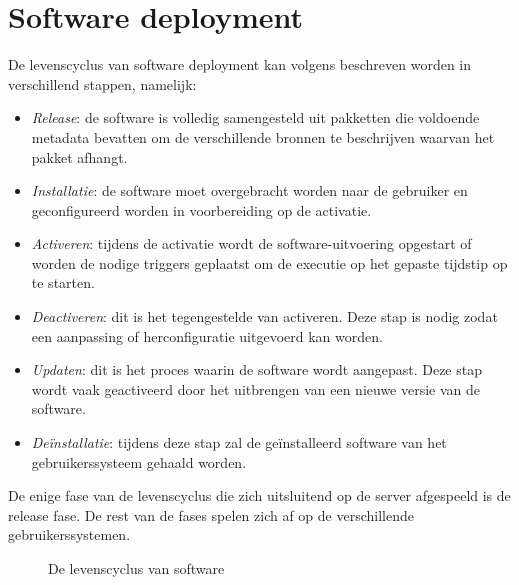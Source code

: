 \section{Software deployment}\label{sec:softwareLevenscyclus}
De levenscyclus van software deployment kan volgens \citet{softwareDeployment,hall1999cooperative} beschreven worden in verschillend stappen, namelijk:
\begin{itemize}
\item \emph{Release}: de software is volledig samengesteld uit pakketten die voldoende metadata bevatten om de verschillende bronnen te beschrijven waarvan het pakket afhangt.
\item \emph{Installatie}: de software moet overgebracht worden naar de gebruiker en geconfigureerd worden in voorbereiding op de activatie.
\item \emph{Activeren}: tijdens de activatie wordt de software-uitvoering opgestart of worden de nodige triggers geplaatst om de executie op het gepaste tijdstip op te starten.
\item \emph{Deactiveren}: dit is het tegengestelde van activeren. Deze stap is nodig zodat een aanpassing of herconfiguratie uitgevoerd kan worden.
\item \emph{Updaten}: dit is het proces waarin de software wordt aangepast. Deze stap wordt vaak geactiveerd door het uitbrengen van een nieuwe versie van de software.
\item \emph{Deïnstallatie}: tijdens deze stap zal de geïnstalleerd software van het gebruikerssysteem gehaald worden.
\end{itemize}
De enige fase van de levenscyclus die zich uitsluitend op de server afgespeeld is de release fase.
De rest van de fases spelen zich af op de verschillende gebruikerssystemen.

\begin{figure}[!ht]
\centering
{}
\caption{De levenscyclus van software \citep{carzaniga1998characterization}}
\label{fig:softwareLevenscyclus}
\end{figure}

